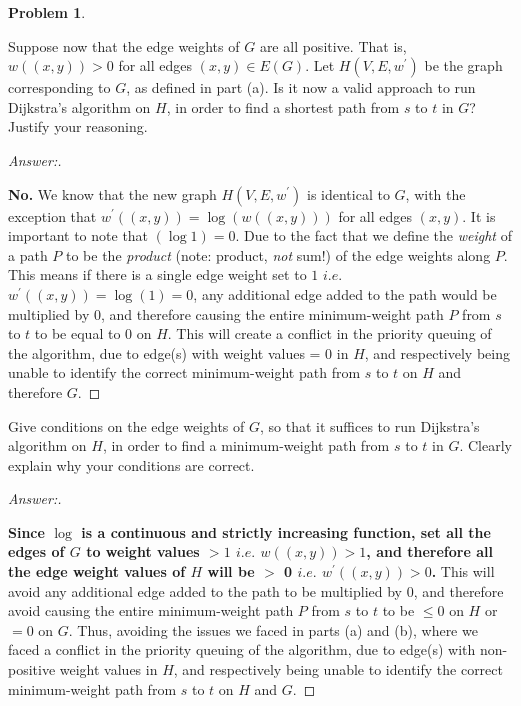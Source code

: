 \documentclass[11pt]{article}
\theoremstyle{definition}
\theoremstyle{definition}
\newtheorem{required}{Problem}
\theoremstyle{definition}
\begin{document}
\begin{required}
\begin{enumerate}[label=(\alph*)]
\hskip 20pt
\item Suppose now that the edge weights of $G$ are all positive. That is, $w((x, y)) > 0$ for all edges $(x, y) \in E(G)$. Let $H(V, E, w^{\prime})$ be the graph corresponding to $G$, as defined in part (a). Is it now a valid approach to run Dijkstra's algorithm on $H$, in order to find a shortest path from $s$ to $t$ in $G$? Justify your reasoning.

\begin{proof}[Answer:] \
\item \textbf{No.} We know that the new graph $H(V, E, w^{\prime})$ is identical to $G$, with the exception that $w^{\prime}((x, y)) = \log(w((x, y)))$ for all edges $(x,y)$. It is important to note that $(\log{1}) = 0$. Due to the fact that we define the \emph{weight} of a path $P$ to be the \emph{product} (note: product, \emph{not} sum!) of the edge weights along $P$. This means if there is a single edge weight set to $1$ $i.e.$ $w^{\prime}((x, y)) = \log(1) = 0$, any additional edge added to the path would be multiplied by $0$, and therefore causing the entire minimum-weight path $P$ from $s$ to $t$ to be equal to $0$ on $H$. This will create a conflict in the priority queuing of the algorithm, due to edge(s) with weight values = 0 in $H$, and respectively being unable to identify the correct minimum-weight path from $s$ to $t$ on $H$ and therefore $G$.
\end{proof}


\hskip 20pt
\item Give conditions on the edge weights of $G$, so that it suffices to run Dijkstra's algorithm on $H$, in order to find a minimum-weight path from $s$ to $t$ in $G$. Clearly explain why your conditions are correct.

\begin{proof}[Answer:] \
\item \textbf{Since $\log$ is a continuous and strictly increasing function, set all the edges of $G$ to weight values $> 1$ $i.e.$ $w((x, y)) > 1$, and therefore all the edge weight values of $H$ will be $>$ 0 $i.e.$ $w^{\prime}((x, y)) > 0$.} This will avoid any additional edge added to the path to be multiplied by $0$, and therefore avoid  causing the entire minimum-weight path $P$ from $s$ to $t$ to be $\leq 0$ on $H$ or $= 0$ on $G$. Thus, avoiding the issues we faced in parts (a) and (b), where we faced a conflict in the priority queuing of the algorithm, due to edge(s) with non-positive weight values in $H$, and respectively being unable to identify the correct minimum-weight path from $s$ to $t$ on $H$ and $G$.
\end{proof}

\end{enumerate}

\end{required}




\end{document}
